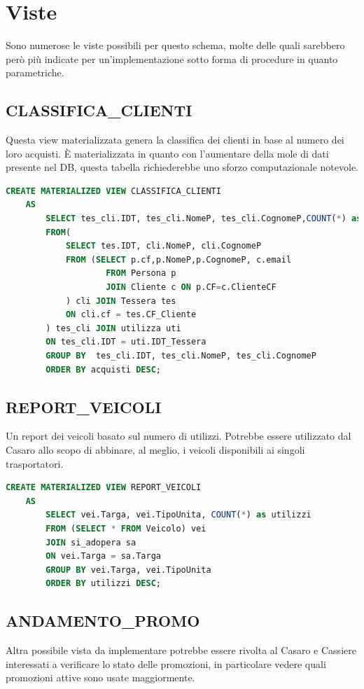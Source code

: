 \documentclass[12pt]{report}
\begin{document}
\section{Viste}
Sono numerose le viste possibili per questo schema, molte delle quali sarebbero però più indicate per un'implementazione sotto forma di procedure in quanto parametriche.

\subsection*{CLASSIFICA\_CLIENTI}
Questa view materializzata genera la classifica dei clienti in base al numero dei loro acquisti. È materializzata in quanto con l'aumentare della mole di dati presente nel DB, questa tabella richiederebbe uno sforzo computazionale notevole.

\begin{lstlisting}[language=SQL,caption={CLASSIFICA\_CLIENTI}]
    CREATE MATERIALIZED VIEW CLASSIFICA_CLIENTI
    AS
        SELECT tes_cli.IDT, tes_cli.NomeP, tes_cli.CognomeP,COUNT(*) as acquisti
        FROM(
            SELECT tes.IDT, cli.NomeP, cli.CognomeP
            FROM (SELECT p.cf,p.NomeP,p.CognomeP, c.email 
                    FROM Persona p 
                    JOIN Cliente c ON p.CF=c.ClienteCF
            ) cli JOIN Tessera tes
            ON cli.cf = tes.CF_Cliente
        ) tes_cli JOIN utilizza uti
        ON tes_cli.IDT = uti.IDT_Tessera
        GROUP BY  tes_cli.IDT, tes_cli.NomeP, tes_cli.CognomeP
        ORDER BY acquisti DESC;
\end{lstlisting}

\subsection*{REPORT\_VEICOLI}
Un report dei veicoli basato sul numero di utilizzi. Potrebbe essere utilizzato dal Casaro allo scopo di abbinare, al meglio, i veicoli disponibili ai singoli trasportatori.

\begin{lstlisting}[language=SQL,caption={REPORT\_VEICOLI}]
    CREATE MATERIALIZED VIEW REPORT_VEICOLI
    AS
        SELECT vei.Targa, vei.TipoUnita, COUNT(*) as utilizzi
        FROM (SELECT * FROM Veicolo) vei
        JOIN si_adopera sa
        ON vei.Targa = sa.Targa
        GROUP BY vei.Targa, vei.TipoUnita
        ORDER BY utilizzi DESC;
\end{lstlisting}

\subsection*{ANDAMENTO\_PROMO}
Altra possibile vista da implementare potrebbe essere rivolta al Casaro e Cassiere interessati a verificare lo stato delle promozioni, in particolare vedere quali promozioni attive sono usate maggiormente.
\end{document}
